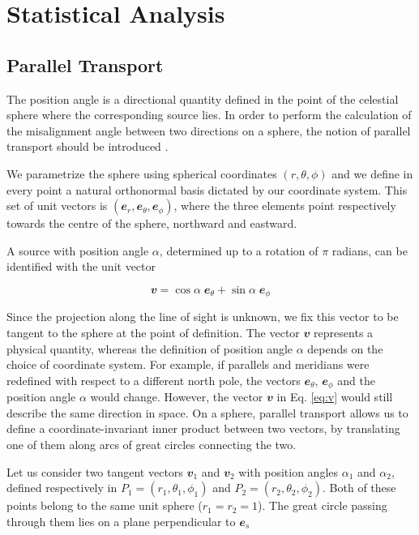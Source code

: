 \section{Statistical Analysis}
	\label{sec:SA}
	\subsection{Parallel Transport}	
		\label{sec:PT}  	
		
				
		The position angle is a directional quantity defined in the point of the celestial sphere where the corresponding source lies. In order to perform the calculation of the misalignment angle between two directions on a sphere, the notion of parallel transport should be introduced \citep{Jain2004}.
		
		We parametrize the sphere using spherical coordinates $(r, \theta, \phi)$ and we define in every point a natural orthonormal basis dictated by our coordinate system. This set of unit vectors is $(\mathbfit{e}_r, \mathbfit{e}_\theta, \mathbfit{e}_\phi)$, where the three elements point respectively towards the centre of the sphere, northward and eastward.	
		
		A source with position angle $\alpha$, determined up to a rotation of $\pi$ radians, can be identified with the unit vector
		
		\begin{equation}
			\mathbfit{v} = \cos\alpha \; \mathbfit{e}_\theta + \sin \alpha \; \mathbfit{e}_\phi
			\label{eq:v}
		\end{equation}
		
		Since the projection along the line of sight is unknown, we fix this vector to be tangent to the sphere at the point of definition.  
		The vector $\mathbfit{v}$ represents a physical quantity, whereas the definition of position angle $\alpha$ depends on the choice of coordinate system. For example, if parallels and meridians were redefined with respect to a different north pole, the vectors $\mathbfit{e}_\theta$, $\mathbfit{e}_\phi$ and the position angle $\alpha$ would change. However, the vector $\mathbfit{v}$ in Eq. \eqref{eq:v} would still describe the same direction in space.
		On a sphere, parallel transport allows us to define a coordinate-invariant inner product between two vectors, by translating one of them along arcs of great circles connecting the two.  
		
		Let us consider two tangent vectors $\mathbfit{v}_1$ and $\mathbfit{v}_2$ with position angles $\alpha_1$ and $\alpha_2$, defined respectively in $P_1 = (r_1, \theta_1, \phi_1)$ and $P_2 = (r_2, \theta_2, \phi_2)$. Both of these points belong to the same unit sphere ($r_1 = r_2 = 1$). The great circle passing through them lies on a plane perpendicular to $\mathbfit{e}_s$
		
